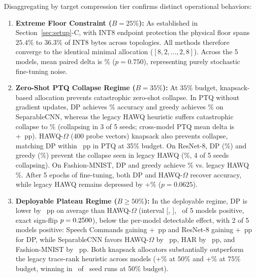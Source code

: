 \documentclass{ieeeaccess}
\begin{document}
Disaggregating by target compression tier confirms distinct operational behaviors:
\begin{enumerate}
    \item \textbf{Extreme Floor Constraint ($B = 25\%$):} As established in Section~\ref{sec:setup}-C, with INT8 endpoint protection the physical floor spans $25.4\%$ to $36.3\%$ of INT8 bytes across topologies. All methods therefore converge to the identical minimal allocation ($[8, 2, \dots, 2, 8]$). Across the 5 models, mean paired delta is \MacroStoryDPHAWQTwentyFive\% ($p = 0.750$), representing purely stochastic fine-tuning noise.
    \item \textbf{Zero-Shot PTQ Collapse Regime ($B = 35\%$):} At $35\%$ budget, knapsack-based allocation prevents catastrophic zero-shot collapse. In PTQ without gradient updates, DP achieves \MacroSepCNNDPThirtyFivePTQ\% accuracy and greedy achieves \MacroSepCNNGreedyThirtyFivePTQ\% on SeparableCNN, whereas the legacy HAWQ heuristic suffers catastrophic collapse to \MacroSepCNNHAWQThirtyFivePTQ\% (collapsing in 3 of 5 seeds; cross-model PTQ mean delta is +\MacroPTQLegacyMeanDeltaThirtyFive\ pp). HAWQ-$\Omega$ (400 probe vectors) knapsack also prevents collapse, matching DP within \MacroPTQOmegaMeanDeltaThirtyFive\ pp in PTQ at 35\% budget. On ResNet-8, DP (\MacroResNetDPThirtyFivePTQ\%) and greedy (\MacroResNetGreedyThirtyFivePTQ\%) prevent the collapse seen in legacy HAWQ (\MacroResNetHAWQThirtyFivePTQ\%, 4 of 5 seeds collapsing). On Fashion-MNIST, DP and greedy achieve \MacroFMNISTDPThirtyFivePTQ\% vs. legacy HAWQ \MacroFMNISTHAWQThirtyFivePTQ\%. After 5 epochs of fine-tuning, both DP and HAWQ-$\Omega$ recover accuracy, while legacy HAWQ remains depressed by +\MacroStoryDPHAWQThirtyFive\% ($p = 0.0625$).
    \item \textbf{Deployable Plateau Regime ($B \ge 50\%$):} In the deployable regime, DP is lower by \MacroOmegaAbsMeanDelta\ pp on average than HAWQ-$\Omega$ (interval [\MacroOmegaCILow, \MacroOmegaCIHigh], \MacroOmegaWins\ of 5 models positive, exact sign-flip $p = 0.2500$), below the per-model detectable effect, with 2 of 5 models positive: Speech Commands gaining +\MacroOmegaDeltaSpeech\ pp and ResNet-8 gaining +\MacroOmegaDeltaResNet\ pp for DP, while SeparableCNN favors HAWQ-$\Omega$ by \MacroOmegaDeltaSepCNN\ pp, HAR by \MacroOmegaDeltaHAR\ pp, and Fashion-MNIST by \MacroOmegaDeltaFMNIST\ pp. Both knapsack allocators substantially outperform the legacy trace-rank heuristic across models (+\MacroStoryDPHAWQFifty\% at $50\%$ and +\MacroStoryDPHAWQSeventyFive\% at $75\%$ budget, winning in \MacroSeedLevelPositiveFiftyCount\ of \MacroSeedLevelPositiveFiftyTotal\ seed runs at 50\% budget).
\end{enumerate}
\end{document}
